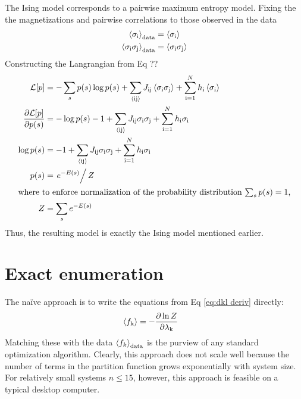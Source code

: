\documentclass[aps,prl,twocolumn]{revtex4-1}
\begin{document}
The Ising model corresponds to a pairwise maximum entropy model.
Fixing the the magnetizations and pairwise correlations to those observed in the data
\begin{align}
	\left<\sigma_{\rm i}\right>_{\rm data} &= \left<\sigma_{\rm i}\right>\\
	\left<\sigma_{\rm i}\sigma_{\rm j}\right>_{\rm data} &= \left<\sigma_{\rm i}\sigma_{\rm j}\right>
\end{align}
Constructing the Langrangian from Eq ??
\begin{align}
	\mathcal{L}[p] &= -\sum_s p(s)\log p(s) +\sum_{\rm \left<ij\right>} J_{\rm ij}\left<\sigma_{\rm i}\sigma_{\rm j}\right> +\sum_{\rm i=1}^Nh_{\rm i}\left<\sigma_{\rm i}\right>\\
	\frac{\partial\mathcal{L}[p]}{\partial p(s)} &= -\log p(s)-1 +\sum_{\rm \left<ij\right>} J_{\rm ij}\sigma_{\rm i}\sigma_{\rm j} +\sum_{\rm i=1}^Nh_{\rm i}\sigma_{\rm i}\\
	\log p(s) &= -1 +\sum_{\rm \left<ij\right>} J_{\rm ij}\sigma_{\rm i}\sigma_{\rm j} +\sum_{\rm i=1}^Nh_{\rm i}\sigma_{\rm i}\\
	p(s) &= \left.e^{-E(s)}\right/Z\\
\intertext{where to enforce normalization of the probability distribution $\sum_s p(s) = 1$,}
	Z &= \sum_s e^{-E(s)}
\end{align}
Thus, the resulting model is exactly the Ising model mentioned earlier.



\section{Exact enumeration}
The na\"{i}ve approach is to write the equations from Eq \ref{eq:dkl deriv} directly:
\begin{align}
	\left<f_{\rm k}\right> &= -\frac{\partial \ln Z}{\partial \lambda_{\rm k}}
\end{align}
Matching these with the data $\left<f_k\right>_{\rm data}$ is the purview of any standard optimization algorithm. Clearly, this approach does not scale well because the number of terms in the partition function grows exponentially with system size. For relatively small systems $n\leq15$, however, this approach is feasible on a typical desktop computer.
\end{document}
